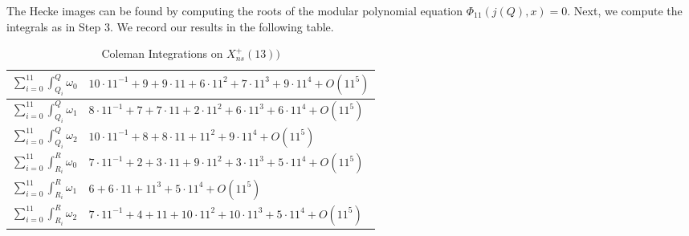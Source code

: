 \begin{itemize}
The Hecke images can be found by computing the roots of the modular polynomial
equation $\Phi_{11}(j(Q),x) = 0$. Next, we compute the integrals as in Step 3. We record our results in the following table.

\begin{table}[h]
\label{table:X_{ns}_13}

    \centering
    \begin{tabular}{|l|l|}
    
    \hline
    \rule{0pt}{4ex}    
        $\sum_{i=0}^{11}\int^Q_{Q_i} \omega_0 $    & $10\cdot 11^{-1} + 9 + 9\cdot 11  + 6 \cdot 11^2 + 7\cdot 11^3 + 9\cdot 11^4 + O(11^5)$ 
            \rule{0pt}{4ex} \\
    
    \hline 
    \rule{0pt}{4ex}
    $\sum_{i=0}^{11}\int^Q_{Q_i} \omega_1 $ & $8\cdot 11^{-1} + 7 + 7\cdot 11 + 2 \cdot 11^2 + 6\cdot 11^3 + 6\cdot 11^4 + O(11^5)$
\\\hline

    \rule{0pt}{4ex}
    $\sum_{i=0}^{11}\int^Q_{Q_i} \omega_2 $ & $10\cdot 11^{-1} + 8 + 8\cdot 11 + 11^2  + 9\cdot 11^4 + O(11^5)$
\\\hline

    \rule{0pt}{4ex}
    $\sum_{i=0}^{11}\int^R_{R_i} \omega_0 $ & $7\cdot 11^{-1} + 2 + 3\cdot 11 + 9 \cdot 11^2  + 3\cdot 11^3 + 5\cdot 11^4 + O(11^5) $
\\\hline

    \rule{0pt}{4ex}
    $\sum_{i=0}^{11}\int^R_{R_i} \omega_1 $ & $6 + 6\cdot 11 + 11^3 + 5\cdot 11^4 + O(11^5)$ 
\\\hline

    \rule{0pt}{4ex}
    $\sum_{i=0}^{11}\int^R_{R_i} \omega_2 $ & $7\cdot 11^{-1} + 4 + 11 + 10 \cdot 11^2 +  10\cdot 11^3 + 5\cdot 11^4 + O(11^5)$ 
\\\hline
    \end{tabular}
    \caption{Coleman Integrations on $X_{ns}^+(13))$}
    \label{table:X_{ns}^+(13)_results}
\end{table}

\end{itemize}
        